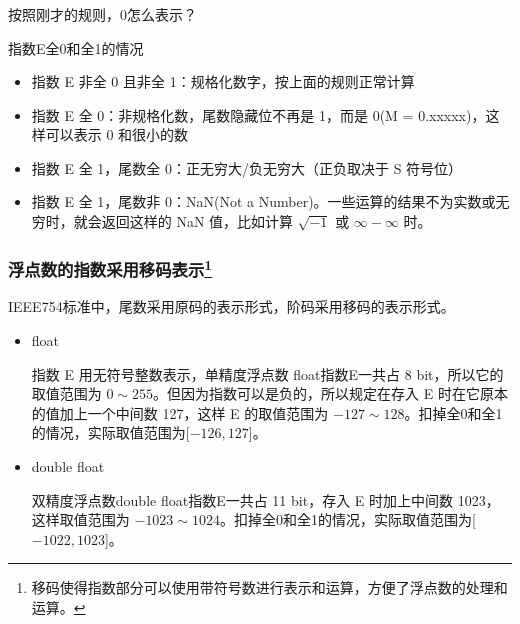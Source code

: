 \begin{frame}[t]
    \frametitle{}
    \begin{question}
        按照刚才的规则，0怎么表示？
    \end{question}
    \pause
     指数E全0和全1的情况
    \begin{itemize}
        \item 指数 E 非全 0 且非全 1：规格化数字，按上面的规则正常计算
        \item 指数 E 全 0：非规格化数，尾数隐藏位不再是 1，而是 0(M = 0.xxxxx)，这样可以表示 0 和很小的数
        \item 指数 E 全 1，尾数全 0：正无穷大/负无穷大（正负取决于 S 符号位）
        \item 指数 E 全 1，尾数非 0：NaN(Not a Number)。一些运算的结果不为实数或无穷时，就会返回这样的 NaN 值，比如计算 {\color{Green} $\sqrt{-1}$} 或 {\color{Green} $\infty -\infty$ } 时。
      \end{itemize}
\end{frame}

\begin{frame}[t]
    \frametitle{浮点数的指数采用移码表示\footnote{移码使得指数部分可以使用带符号数进行表示和运算，方便了浮点数的处理和运算。}}
     IEEE754标准中，尾数采用原码的表示形式，阶码采用移码的表示形式。
    \begin{itemize}
      \item float
      
      指数 E 用无符号整数表示，单精度浮点数 float指数E一共占 8 bit，所以它的取值范围为 $0 \sim 255$。但因为指数可以是负的，所以规定在存入 E 时在它原本的值加上一个中间数 127，这样 E 的取值范围为 $-127 \sim 128$。扣掉全0和全1的情况，实际取值范围为[$-126,127$]。
      \item double float
      
      双精度浮点数double float指数E一共占 11 bit，存入 E 时加上中间数 1023，这样取值范围为 $-1023 \sim 1024$。扣掉全0和全1的情况，实际取值范围为[$-1022,1023$]。
    \end{itemize}
\end{frame}


